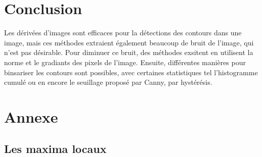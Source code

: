 \documentclass[a4paper,11pt]{article}
\begin{document}
  \section{Conclusion}
  Les dérivées d'images sont efficaces pour la détections des contours dans une image, mais ces méthodes 
  extraient également beaucoup de bruit de l'image, qui n'est pas désirable. Pour diminuer ce bruit, des méthodes
  exsitent en utilisent la norme et le gradiants des pixels de l'image. Ensuite, différentes manières pour 
  binsariser les contours sont possibles, avec certaines statistiques tel l'histogramme cumulé ou en encore 
  le seuillage proposé par Canny, par hystérésis.
  
  
  \newpage
  
  \section{Annexe}
  
  \subsection{Les maxima locaux}
  
\end{document}

